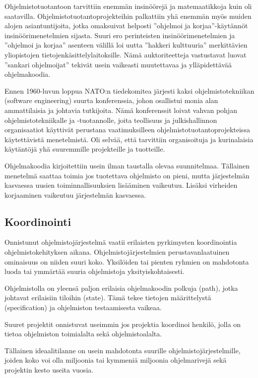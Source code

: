 \documentclass[finnish]{tktltiki2}
\theoremstyle{definition}
\theoremstyle{remark}
\begin{document}
Ohjelmistotuotantoon tarvittiin enemmän insinöörejä ja matemaatikkoja kuin oli saatavilla. Ohjelmistotuotantoprojekteihin palkattiin yhä enemmän myös muiden alojen asiantuntijoita, jotka omaksuivat helposti ''ohjelmoi ja korjaa''-käytännöt insinöörimenetelmien sijasta. Suuri ero perinteisten insinöörimenetelmien ja ''ohjelmoi ja korjaa'' asenteen välillä loi uutta ''hakkeri kulttuuria'' merkittävien yliopistojen tietojenkäsittelylaitoksille. Nämä auktoriteetteja vastustavat luovat ''sankari ohjelmoijat'' tekivät usein vaikeasti muutettavaa ja ylläpidettävää ohjelmakoodia\cite{BOE06}.

Ennen 1960-luvun loppua NATO:n tiedekomitea järjesti kaksi ohjelmistotekniikan (software engineering) suurta konferenssia, johon osallistui monia alan ammattilaisia ja johtavia tutkijoita. Nämä konferenssit loivat vahvan pohjan ohjelmistotekniikalle ja -tuotannolle, joita teollisuus ja julkishallinnon organisaatiot käyttivät perustana vaatimuksilleen ohjelmistotuotantoprojekteissa käytettävistä menetelmistä. Oli selvää, että tarvit\-tiin organisoituja ja kurinalaisia käytäntöjä yhä suuremmille projekteille ja tuotteille\cite{BOE06}.

Ohjelmakoodia kirjoitettiin usein ilman taustalla olevaa suunnitelmaa. Tällainen menetelmä saattaa toimia jos tuotettava ohjelmisto on pieni, mutta järjestelmän kasvaessa uusien toiminnallisuuksien lisääminen vaikeutuu. Lisäksi virheiden korjaaminen vaikeutuu järjestelmän kasvaessa\cite{FOW01a}.

\subsection{Koordinointi}

Onnistunut ohjelmistojärjestelmä vaatii erilaisten pyrkimysten koordinointia ohjelmistokehityksen aikana. Ohjelmistojärjestelmien perustavanlaatuinen ominaisuus on niiden suuri koko. Yksilöiden tai pienten ryhmien on mahdotonta luoda tai ymmärtää suuria ohjelmistoja yksityiskohtaisesti\cite{KES95}.

Ohjelmistolla on yleensä paljon erilaisia ohjelmakoodin polkuja (path), jotka johtavat erilaisiin tiloihin (state). Tämä tekee tietojen määrittelystä (specification) ja ohjelmiston testaamisesta vaikeaa\cite{BOE06}.

Suuret projektit onnistuvat useimmin jos projektia koordinoi henkilö, jolla on tietoa ohjelmiston toimialalta sekä ohjelmistoalalta\cite{KES95}.

Tällainen ideaalitilanne on usein mahdotonta suurille ohjelmistojärjestelmille, joiden koko voi olla miljoonia tai kymmeniä miljoonia ohjelmarivejä sekä projektin kesto useita vuosia\cite{KES95}.
\end{document}

